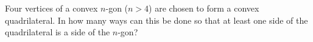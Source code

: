 Four vertices of a convex $n$-gon ($n>4$) are chosen to form a convex quadrilateral. In how many ways can this be done so that at least one side of the quadrilateral is a side of the $n$-gon?
